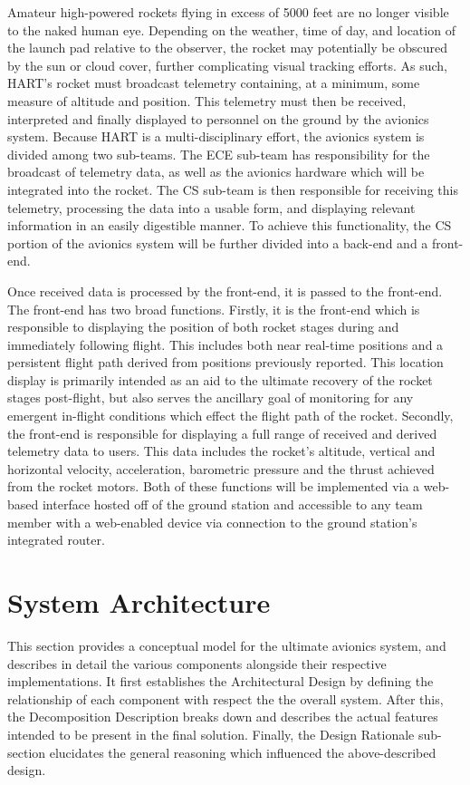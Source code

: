 \documentclass[onecolumn, draftclsnofoot,10pt, compsoc]{IEEEtran}
\begin{document}
Amateur high-powered rockets flying in excess of 5000 feet are no longer visible to the naked human eye. 
Depending on the weather, time of day, and location of the launch pad relative to the observer, the rocket may potentially be obscured by the sun or cloud cover, further complicating visual tracking efforts. 
As such, HART's rocket must broadcast telemetry containing, at a minimum, some measure of altitude and position.
This telemetry must then be received, interpreted and finally displayed to personnel on the ground by the avionics system.
Because HART is a multi-disciplinary effort, the avionics system is divided among two sub-teams.
The ECE sub-team has responsibility for the broadcast of telemetry data, as well as the avionics hardware which will be integrated into the rocket.
The CS sub-team is then responsible for receiving this telemetry, processing the data into a usable form, and displaying relevant information in an easily digestible manner.
To achieve this functionality, the CS portion of the avionics system will be further divided into a back-end and a front-end.
  

Once received data is processed by the front-end, it is passed to the front-end.
The front-end has two broad functions.
Firstly, it is the front-end which is responsible to displaying the position of both rocket stages during and immediately following flight.
This includes both near real-time positions and a persistent flight path derived from positions previously reported.
This location display is primarily intended as an aid to the ultimate recovery of the rocket stages post-flight, but also serves the ancillary goal of monitoring for any emergent in-flight conditions which effect the flight path of the rocket.
Secondly, the front-end is responsible for displaying a full range of received and derived telemetry data to users.
This data includes the rocket’s altitude, vertical and horizontal velocity, acceleration, barometric pressure and the thrust achieved from the rocket motors.
Both of these functions will be implemented via a web-based interface hosted off of the ground station and accessible to any team member with a web-enabled device via connection to the ground station's integrated router. 


\section{System Architecture}
This section provides a conceptual model for the ultimate avionics system, and describes in detail the various components alongside their respective implementations.
It first establishes the Architectural Design by defining the relationship of each component with respect the the overall system.
After this, the Decomposition Description breaks down and describes the actual features intended to be present in the final solution.
Finally, the Design Rationale sub-section elucidates the general reasoning which influenced the above-described design.
\end{document}
